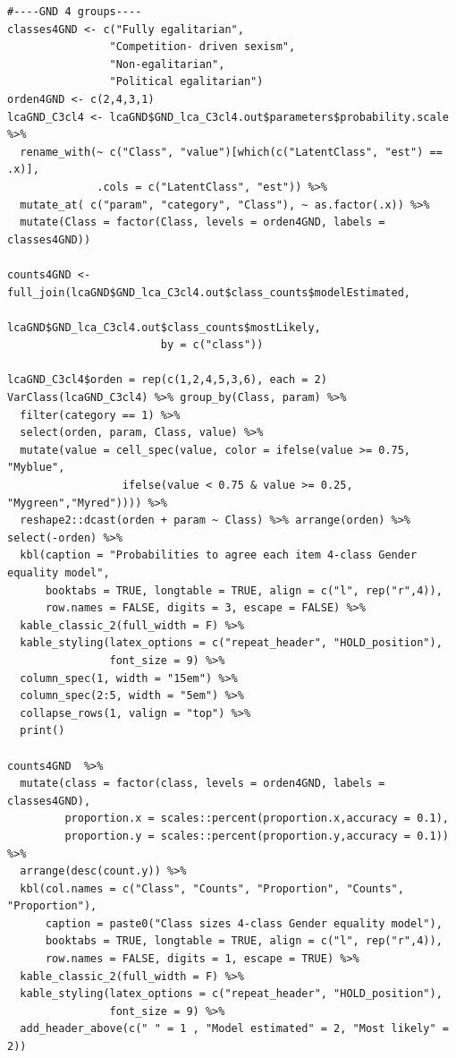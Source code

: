 \documentclass[12pt,a4paper,oneside]{reedthesis}
\begin{document}
\begin{verbatim}
#----GND 4 groups----
classes4GND <- c("Fully egalitarian",
                "Competition- driven sexism",
                "Non-egalitarian",
                "Political egalitarian")
orden4GND <- c(2,4,3,1)
lcaGND_C3cl4 <- lcaGND$GND_lca_C3cl4.out$parameters$probability.scale %>% 
  rename_with(~ c("Class", "value")[which(c("LatentClass", "est") == .x)], 
              .cols = c("LatentClass", "est")) %>% 
  mutate_at( c("param", "category", "Class"), ~ as.factor(.x)) %>% 
  mutate(Class = factor(Class, levels = orden4GND, labels = classes4GND))

counts4GND <- full_join(lcaGND$GND_lca_C3cl4.out$class_counts$modelEstimated,
                        lcaGND$GND_lca_C3cl4.out$class_counts$mostLikely,
                        by = c("class"))

lcaGND_C3cl4$orden = rep(c(1,2,4,5,3,6), each = 2) 
VarClass(lcaGND_C3cl4) %>% group_by(Class, param) %>% 
  filter(category == 1) %>% 
  select(orden, param, Class, value) %>% 
  mutate(value = cell_spec(value, color = ifelse(value >= 0.75, "Myblue", 
                  ifelse(value < 0.75 & value >= 0.25, "Mygreen","Myred")))) %>% 
  reshape2::dcast(orden + param ~ Class) %>% arrange(orden) %>% select(-orden) %>% 
  kbl(caption = "Probabilities to agree each item 4-class Gender equality model",
      booktabs = TRUE, longtable = TRUE, align = c("l", rep("r",4)), 
      row.names = FALSE, digits = 3, escape = FALSE) %>%
  kable_classic_2(full_width = F) %>% 
  kable_styling(latex_options = c("repeat_header", "HOLD_position"), 
                font_size = 9) %>% 
  column_spec(1, width = "15em") %>%  
  column_spec(2:5, width = "5em") %>%  
  collapse_rows(1, valign = "top") %>% 
  print()

counts4GND  %>% 
  mutate(class = factor(class, levels = orden4GND, labels = classes4GND),
         proportion.x = scales::percent(proportion.x,accuracy = 0.1),
         proportion.y = scales::percent(proportion.y,accuracy = 0.1)) %>% 
  arrange(desc(count.y)) %>% 
  kbl(col.names = c("Class", "Counts", "Proportion", "Counts", "Proportion"),
      caption = paste0("Class sizes 4-class Gender equality model"),
      booktabs = TRUE, longtable = TRUE, align = c("l", rep("r",4)), 
      row.names = FALSE, digits = 1, escape = TRUE) %>%
  kable_classic_2(full_width = F) %>% 
  kable_styling(latex_options = c("repeat_header", "HOLD_position"), 
                font_size = 9) %>% 
  add_header_above(c(" " = 1 , "Model estimated" = 2, "Most likely" = 2))


\end{verbatim}
\end{document}
